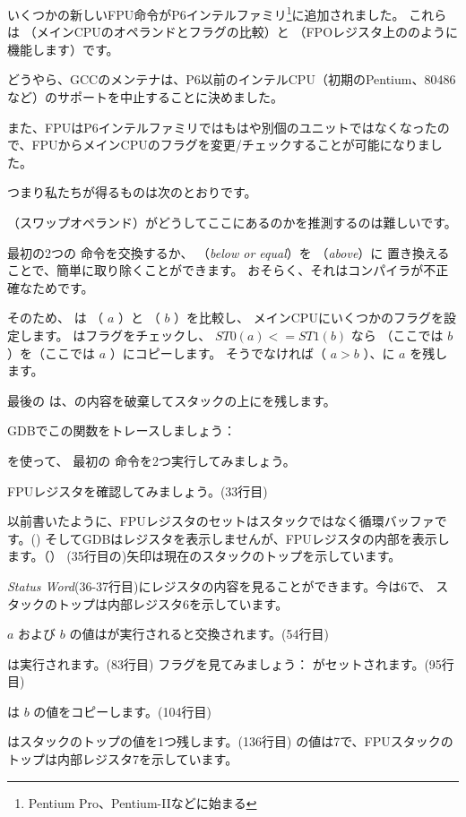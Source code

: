 ﻿
\label{gcc481_o3}

いくつかの新しいFPU命令がP6インテルファミリ\footnote{Pentium Pro、Pentium-IIなどに始まる}に追加されました。 
これらは  （メインCPUのオペランドとフラグの比較）と
 （FPOレジスタ上ののように機能します）です。

どうやら、GCCのメンテナは、P6以前のインテルCPU（初期のPentium、80486など）のサポートを中止することに決めました。

また、FPUはP6インテルファミリではもはや別個のユニットではなくなったので、FPUからメインCPUのフラグを変更/チェックすることが可能になりました。

つまり私たちが得るものは次のとおりです。



 （スワップオペランド）がどうしてここにあるのかを推測するのは難しいです。

最初の2つの \FLD 命令を交換するか、  （\emph{below or equal}）を  （\emph{above}）に
置き換えることで、簡単に取り除くことができます。 
おそらく、それはコンパイラが不正確なためです。

そのため、  は  （ $a$ ）と （ $b$ ）を比較し、
メインCPUにいくつかのフラグを設定します。 
はフラグをチェックし、 $ST0 (a) <= ST1 (b)$ なら
（ここでは $b$ ）を（ここでは $a$ ）にコピーします。
そうでなければ（ $a>b$ ）、に $a$ を残します。

最後の \FSTP は、の内容を破棄してスタックの上にを残します。

GDBでこの関数をトレースしましょう：



を使って、
最初の \FLD 命令を2つ実行してみましょう。

FPUレジスタを確認してみましょう。(33行目)

以前書いたように、FPUレジスタのセットはスタックではなく循環バッファです。()
そしてGDBはレジスタを表示しませんが、FPUレジスタの内部を表示します。（）
(35行目の)矢印は現在のスタックのトップを示しています。

\emph{Status Word}(36-37行目)にレジスタの内容を見ることができます。今は6で、
スタックのトップは内部レジスタ6を示しています。

$a$ および $b$ の値はが実行されると交換されます。(54行目)

は実行されます。(83行目)
フラグを見てみましょう： \CF がセットされます。(95行目)

 は $b$ の値をコピーします。(104行目)

\FSTP はスタックのトップの値を1つ残します。(136行目)
の値は7で、FPUスタックのトップは内部レジスタ7を示しています。
